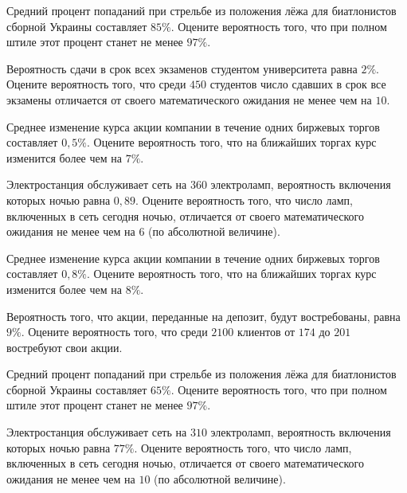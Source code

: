 \z Средний процент попаданий при стрельбе из положения лёжа для биатлонистов сборной Украины составляет $ 85 \% $. Оцените вероятность того, что при полном штиле этот процент станет не менее $ 97 \% $.


\vfill

\z Вероятность сдачи в срок всех экзаменов студентом университета равна $ 2 \% $. Оцените вероятность того, что среди $ 450 $ студентов число сдавших в срок все экзамены отличается от своего математического ожидания не менее чем на $ 10 $. 
 

\vfill

\newpage\setcounter{zad}{0}

\z Среднее изменение курса акции компании в течение одних биржевых торгов составляет $ 0{,}5 \% $. Оцените вероятность того, что на ближайших торгах курс изменится более чем на $ 7 \% $.


\vfill

\z Электростанция обслуживает сеть на $ 360 $ электроламп, вероятность включения которых ночью равна $ 0{,}89 $. Оцените вероятность того, что число ламп, включенных в сеть сегодня ночью, отличается от своего математического ожидания не менее чем на $ 6 $ (по абсолютной величине). 
 

\vfill

\newpage\setcounter{zad}{0}

\z Среднее изменение курса акции компании в течение одних биржевых торгов составляет $ 0{,}8 \% $. Оцените вероятность того, что на ближайших торгах курс изменится более чем на $ 8 \% $.


\vfill

\z Вероятность того, что акции, переданные на депозит, будут востребованы, равна $ 9 \% $. Оцените вероятность того, что среди $ 2100 $ клиентов от $ 174 $ до $ 201 $ востребуют свои акции.
 

\vfill

\newpage\setcounter{zad}{0}

\z Средний процент попаданий при стрельбе из положения лёжа для биатлонистов сборной Украины составляет $ 65 \% $. Оцените вероятность того, что при полном штиле этот процент станет не менее $ 97 \% $.


\vfill

\z Электростанция обслуживает сеть на $ 310 $ электроламп, вероятность включения которых ночью равна $ 77 \% $. Оцените вероятность того, что число ламп, включенных в сеть сегодня ночью, отличается от своего математического ожидания не менее чем на $ 10 $ (по абсолютной величине). 
 

